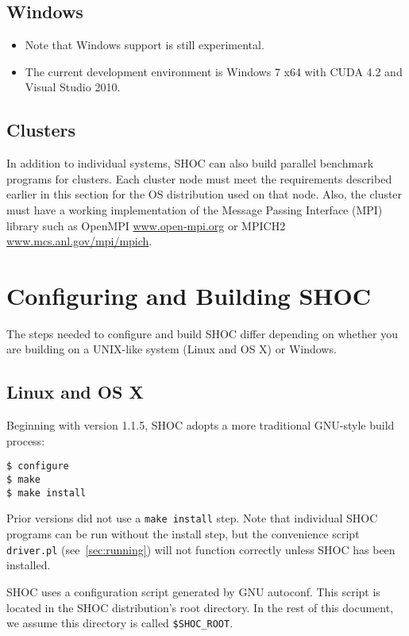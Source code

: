 \documentclass[11pt]{article}
\begin{document}
\subsection{Windows}

\begin{itemize}
\item Note that Windows support is still experimental.
\item The current development environment is Windows 7 x64 with CUDA 4.2 and Visual Studio 2010.
\end{itemize}


\subsection{Clusters}
In addition to individual systems, SHOC can also build parallel benchmark
programs for clusters. Each cluster node must meet the requirements described
earlier in this section for the OS distribution used on that node.
Also, the cluster must have a working implementation of the 
Message Passing Interface 
(MPI)\,\cite{gropp-lusk-skjellum:using-mpi2nd,gropp-lusk-thakur:usingmpi2}
library such as OpenMPI \url{www.open-mpi.org} or MPICH2 
\url{www.mcs.anl.gov/mpi/mpich}.


\section{Configuring and Building SHOC}\label{sec:configuring}

The steps needed to configure and build SHOC differ depending on whether
you are building on a UNIX-like system (Linux and OS X) or Windows.

\subsection{Linux and OS X}\label{sec:conflinux}

Beginning with version 1.1.5, SHOC adopts a more traditional GNU-style
build process:
\begin{Verbatim}[frame=single]
$ configure
$ make
$ make install
\end{Verbatim}
\noindent Prior versions did not use a \verb+make install+ step.
Note that individual SHOC programs can be run without the install step,
but the convenience script \verb+driver.pl+ (see~\ref{sec:running}) will 
not function correctly unless SHOC has been installed.

SHOC uses a configuration script generated by GNU autoconf.  
This script is located in the SHOC distribution's root directory.
In the rest of this document, we assume this directory is called 
\verb+$SHOC_ROOT+.
\end{document}
